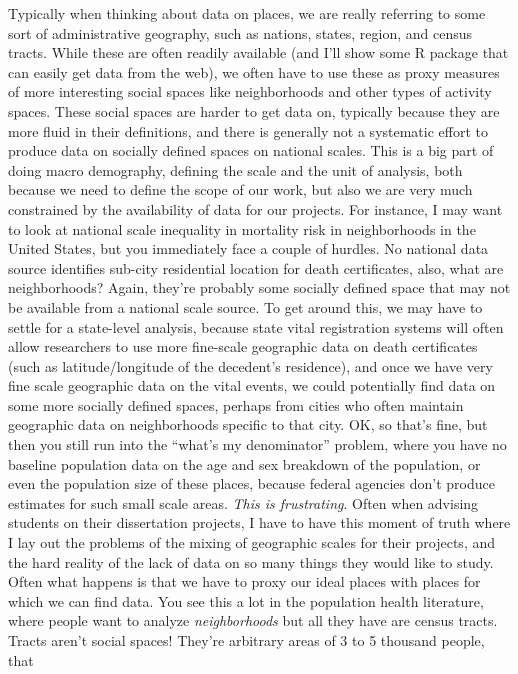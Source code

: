 \documentclass[
  letterpaper,
  DIV=11,
  numbers=noendperiod]{scrreprt}
\begin{document}
Typically when thinking about data on places, we are really referring to
some sort of administrative geography, such as nations, states, region,
and census tracts. While these are often readily available (and I'll
show some R package that can easily get data from the web), we often
have to use these as proxy measures of more interesting social spaces
like neighborhoods and other types of activity spaces. These social
spaces are harder to get data on, typically because they are more fluid
in their definitions, and there is generally not a systematic effort to
produce data on socially defined spaces on national scales. This is a
big part of doing macro demography, defining the scale and the unit of
analysis, both because we need to define the scope of our work, but also
we are very much constrained by the availability of data for our
projects. For instance, I may want to look at national scale inequality
in mortality risk in neighborhoods in the United States, but you
immediately face a couple of hurdles. No national data source identifies
sub-city residential location for death certificates, also, what are
neighborhoods? Again, they're probably some socially defined space that
may not be available from a national scale source. To get around this,
we may have to settle for a state-level analysis, because state vital
registration systems will often allow researchers to use more fine-scale
geographic data on death certificates (such as latitude/longitude of the
decedent's residence), and once we have very fine scale geographic data
on the vital events, we could potentially find data on some more
socially defined spaces, perhaps from cities who often maintain
geographic data on neighborhoods specific to that city. OK, so that's
fine, but then you still run into the ``what's my denominator'' problem,
where you have no baseline population data on the age and sex breakdown
of the population, or even the population size of these places, because
federal agencies don't produce estimates for such small scale areas.
\emph{This is frustrating}. Often when advising students on their
dissertation projects, I have to have this moment of truth where I lay
out the problems of the mixing of geographic scales for their projects,
and the hard reality of the lack of data on so many things they would
like to study. Often what happens is that we have to proxy our ideal
places with places for which we can find data. You see this a lot in the
population health literature, where people want to analyze
\emph{neighborhoods} but all they have are census tracts. Tracts aren't
social spaces! They're arbitrary areas of 3 to 5 thousand people, that
\end{document}
